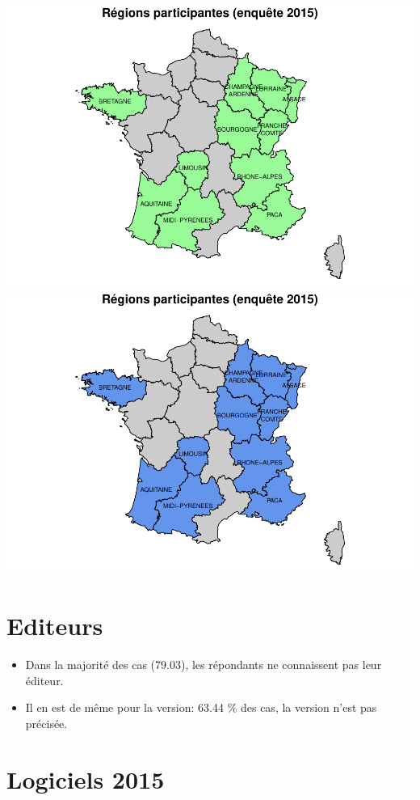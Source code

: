 \documentclass[]{article}
\providecommand{\tightlist}{%
  \setlength{\itemsep}{0pt}\setlength{\parskip}{0pt}}
\begin{document}
\includegraphics{septembre2015_files/figure-latex/unnamed-chunk-5-1.pdf}
\includegraphics{septembre2015_files/figure-latex/unnamed-chunk-5-2.pdf}

\section{Editeurs}\label{editeurs}

\begin{itemize}
\tightlist
\item
  Dans la majorité des cas (79.03), les répondants ne connaissent pas
  leur éditeur.
\item
  Il en est de même pour la version: 63.44 \% des cas, la version n'est
  pas précisée.
\end{itemize}

\section{Logiciels 2015}\label{logiciels-2015}
\end{document}
